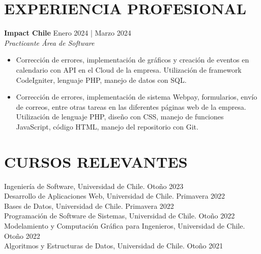 \documentclass[a4paper, 10pt]{extarticle}
\begin{document}
\section*{EXPERIENCIA PROFESIONAL}
\noindent
\textbf{Impact Chile} \hfill Enero 2024 | Marzo 2024\\ %
\textit{Practicante Área de Software}
\begin{itemize}
    \item Corrección de errores, implementación de gráficos y creación de eventos en calendario con API en el Cloud de la empresa. Utilización de framework CodeIgniter, lenguaje PHP, manejo de datos con SQL. 
    \item Corrección de errores, implementación de sistema Webpay, formularios, envío de correos, entre otras tareas en las diferentes páginas web de la empresa. Utilización de lenguaje PHP, diseño con CSS, manejo de funciones JavaScript, código HTML, manejo del repositorio con Git.
\end{itemize}


\section*{CURSOS RELEVANTES}
\noindent
Ingeniería de Software, Universidad de Chile. \hfill Otoño 2023\\[2pt]
Desarrollo de Aplicaciones Web, Universidad de Chile. \hfill Primavera 2022\\[2pt]
Bases de Datos, Universidad de Chile. \hfill Primavera 2022\\[2pt]
Programación de Software de Sistemas, Universidad de Chile. \hfill Otoño 2022\\[2pt]
Modelamiento y Computación Gráfica para Ingenieros, Universidad de Chile. \hfill Otoño 2022\\[2pt]
Algoritmos y Estructuras de Datos, Universidad de Chile. \hfill Otoño 2021
\end{document}
